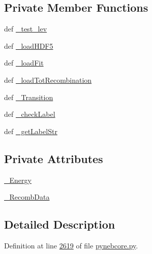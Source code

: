 \subsection*{Private Member Functions}
\begin{DoxyCompactItemize}
\item 
def \hyperlink{classpyneb_1_1core_1_1pynebcore_1_1_rec_atom_a573ceb5efc64c479d5b1fe73373bc033}{\-\_\-test\-\_\-lev}
\item 
def \hyperlink{classpyneb_1_1core_1_1pynebcore_1_1_rec_atom_a71029d3d5f2a3df53427419fb11f1626}{\-\_\-load\-H\-D\-F5}
\item 
def \hyperlink{classpyneb_1_1core_1_1pynebcore_1_1_rec_atom_a1403c9bfa72c8c9e0369cb9e06703f70}{\-\_\-load\-Fit}
\item 
def \hyperlink{classpyneb_1_1core_1_1pynebcore_1_1_rec_atom_a25210efd7f504d58269a52ca14b4c0fc}{\-\_\-load\-Tot\-Recombination}
\item 
def \hyperlink{classpyneb_1_1core_1_1pynebcore_1_1_rec_atom_a32b31a371f3b6ecc5bbbc4d0c5d2a855}{\-\_\-\-Transition}
\item 
def \hyperlink{classpyneb_1_1core_1_1pynebcore_1_1_rec_atom_ae43d7773b11884138df2cf89cd483708}{\-\_\-check\-Label}
\item 
def \hyperlink{classpyneb_1_1core_1_1pynebcore_1_1_rec_atom_afecb53ee6cdd96699b3b9250fbcc957e}{\-\_\-get\-Label\-Str}
\end{DoxyCompactItemize}
\subsection*{Private Attributes}
\begin{DoxyCompactItemize}
\item 
\hyperlink{classpyneb_1_1core_1_1pynebcore_1_1_rec_atom_a652daa9311973780fd44f61e09bc650f}{\-\_\-\-Energy}
\item 
\hyperlink{classpyneb_1_1core_1_1pynebcore_1_1_rec_atom_a1f483d9d99af479ef137489ccefe35e9}{\-\_\-\-Recomb\-Data}
\end{DoxyCompactItemize}


\subsection{Detailed Description}


Definition at line \hyperlink{pynebcore_8py_source_l02619}{2619} of file \hyperlink{pynebcore_8py_source}{pynebcore.\-py}.



